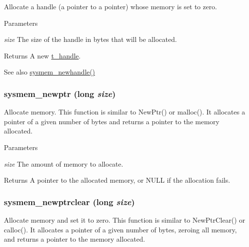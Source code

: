 Allocate a handle (a pointer to a pointer) whose memory is set to zero. 
\begin{DoxyParams}{Parameters}
\item[{\em size}]The size of the handle in bytes that will be allocated. \end{DoxyParams}
\begin{DoxyReturn}{Returns}
A new \hyperlink{group__datatypes_ga0fe64aac41fd3ec071cce295a41d67ad}{t\_\-handle}. 
\end{DoxyReturn}
\begin{DoxySeeAlso}{See also}
\hyperlink{group__memory_gacdacfad4785c71dc8c4ce5d4d9714d54}{sysmem\_\-newhandle()} 
\end{DoxySeeAlso}
\hypertarget{group__memory_ga276676be214edff9fe5c9d0681f39ae6}{
\subsubsection[{sysmem\_\-newptr}]{ sysmem\_\-newptr (long {\em size})}}
\label{group__memory_ga276676be214edff9fe5c9d0681f39ae6}


Allocate memory. This function is similar to NewPtr() or malloc(). It allocates a pointer of a given number of bytes and returns a pointer to the memory allocated.


\begin{DoxyParams}{Parameters}
\item[{\em size}]The amount of memory to allocate. \end{DoxyParams}
\begin{DoxyReturn}{Returns}
A pointer to the allocated memory, or NULL if the allocation fails. 
\end{DoxyReturn}
\hypertarget{group__memory_ga1c178a079247f715c6e34c828d375324}{
\subsubsection[{sysmem\_\-newptrclear}]{ sysmem\_\-newptrclear (long {\em size})}}
\label{group__memory_ga1c178a079247f715c6e34c828d375324}


Allocate memory and set it to zero. This function is similar to NewPtrClear() or calloc(). It allocates a pointer of a given number of bytes, zeroing all memory, and returns a pointer to the memory allocated.


